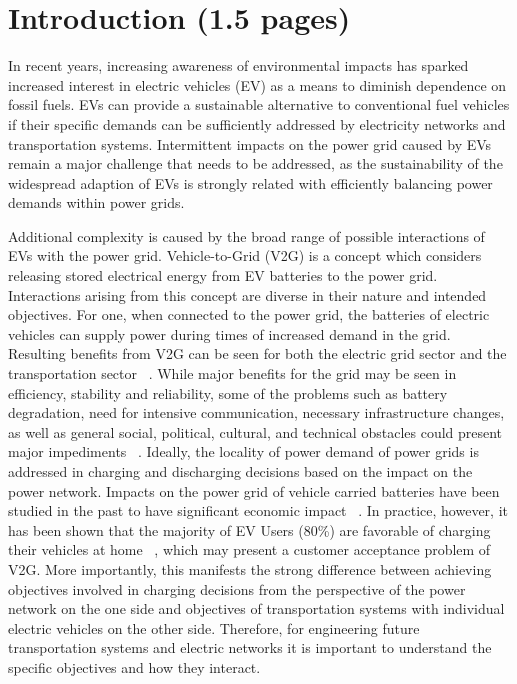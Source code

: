 \section{Introduction (1.5 pages)}

In recent years, increasing awareness of environmental impacts has sparked increased interest in electric vehicles (EV) as a means to diminish dependence on fossil fuels. EVs can provide a sustainable alternative to conventional fuel vehicles if their specific demands can be sufficiently addressed by electricity networks and transportation systems.
Intermittent impacts on the power grid caused by EVs remain a major challenge that needs to be addressed, as the sustainability of the widespread adaption of EVs is strongly related with efficiently balancing power demands within power grids. 

Additional complexity is caused by the broad range of possible interactions of EVs with the power grid. Vehicle-to-Grid (V2G) is a concept which considers releasing stored electrical energy from EV batteries to the power grid. Interactions arising from this concept are diverse in their nature and intended objectives. For one, when connected to the power grid, the batteries of electric vehicles can supply power during times of increased demand in the grid. Resulting benefits from V2G can be seen for both the electric grid sector and the transportation sector ~\cite{tomic2007using}. While major benefits for the grid may be seen in efficiency, stability and reliability, some of the problems such as battery degradation, need for intensive communication, necessary infrastructure changes, as well as general social, political, cultural, and technical obstacles could present major impediments ~\cite{yilmaz2013review}. Ideally, the locality of power demand of power grids is addressed in charging and discharging decisions based on the impact on the power network. Impacts on the power grid of vehicle carried batteries have been studied in the past to have significant economic impact ~\cite{peterson2010economics,erdinc2014economic}. In practice, however, it has been shown that the majority of EV Users (80\%) are favorable of charging their vehicles at home ~\cite{haines2009simulation}, which may present a customer acceptance problem of V2G. More importantly, this manifests the strong difference between achieving objectives involved in charging decisions from the perspective of the power network on the one side and objectives of transportation systems with individual electric vehicles on the other side. Therefore, for engineering future transportation systems and electric networks it is important to understand the specific objectives and how they interact.

